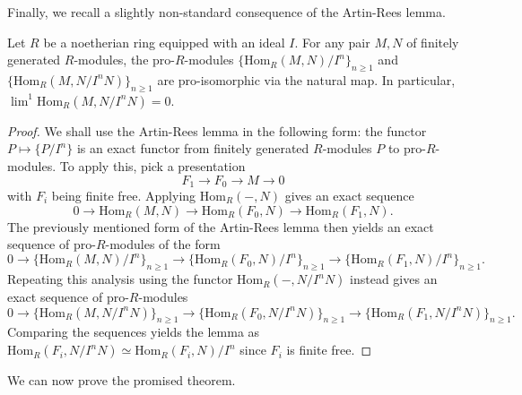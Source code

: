 \documentclass[10pt,reqno]{amsart}
\begin{document}
Finally, we recall a slightly non-standard consequence of the Artin-Rees lemma.

\begin{lemma}
\label{lem:lim1vanishing}
Let $R$ be a noetherian ring equipped with an ideal $I$. For any pair $M,N$ of finitely generated $R$-modules, the pro-$R$-modules $\{\mathrm{Hom}_R(M,N)/I^n\}_{n \geq 1}$ and $\{\mathrm{Hom}_R(M,N/I^nN)\}_{n \geq 1}$ are pro-isomorphic via the natural map. In particular, $\lim^1 \mathrm{Hom}_R(M,N/I^nN) = 0$.
\end{lemma}
\begin{proof}
We shall use the Artin-Rees lemma in the following form: the functor $P \mapsto \{P/I^n\}$ is an exact functor from finitely generated $R$-modules $P$ to pro-$R$-modules. To apply this, pick a presentation 
\[ F_1 \to F_0 \to M \to 0\]
with $F_i$ being finite free. Applying $\mathrm{Hom}_R(-,N)$ gives an exact sequence
\[ 0 \to \mathrm{Hom}_R(M,N) \to \mathrm{Hom}_R(F_0,N) \to \mathrm{Hom}_R(F_1,N).\]
The previously mentioned form of the Artin-Rees lemma then yields an exact sequence of pro-$R$-modules of the form
\[ 0 \to \{\mathrm{Hom}_R(M,N)/I^n\}_{n \geq 1} \to \{\mathrm{Hom}_R(F_0,N)/I^n\}_{n \geq 1} \to \{\mathrm{Hom}_R(F_1,N)/I^n\}_{n \geq 1}.\]
Repeating this analysis using the functor $\mathrm{Hom}_R(-,N/I^nN)$ instead gives an exact sequence of pro-$R$-modules
\[ 0 \to \{\mathrm{Hom}_R(M,N/I^nN)\}_{n \geq 1} \to \{\mathrm{Hom}_R(F_0,N/I^nN)\}_{n \geq 1} \to \{\mathrm{Hom}_R(F_1,N/I^nN)\}_{n \geq 1}.\]
Comparing the sequences yields the lemma as $\mathrm{Hom}_R(F_i,N/I^nN) \simeq \mathrm{Hom}_R(F_i,N)/I^n$ since $F_i$ is finite free.
\end{proof}

We can now prove the promised theorem.
\end{document}
